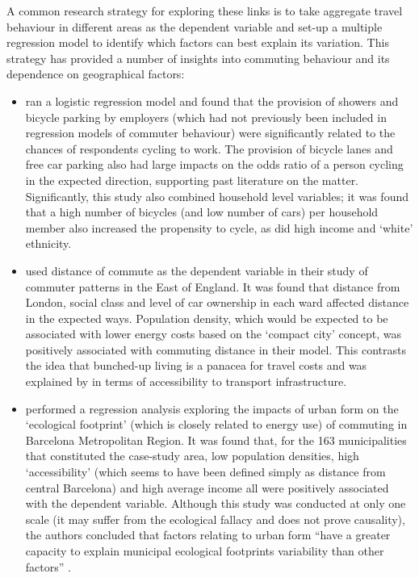 A common research strategy for exploring these links is to take aggregate travel
behaviour in different areas as the dependent variable and set-up a
multiple regression model to identify which factors can best explain its variation.
This strategy has provided a number of insights into commuting
behaviour and its dependence on geographical factors:
\begin{itemize}
 \item \citet{Buehler2012} ran a logistic regression model and found that
 the provision of showers and bicycle parking by employers (which
 had not previously been included in regression models of commuter behaviour)
 were significantly related to the chances of respondents cycling to work.
 The provision of bicycle lanes and free car parking also had large
 impacts on the odds ratio of a person cycling in the expected
 direction, supporting past literature on the matter. Significantly, this
 study also combined household level variables; it was found that a high number
 of bicycles (and low number of cars) per household member also increased the
 propensity to cycle, as did high income and `white' ethnicity.
 \item  \citet{Titheridge2006} used distance of commute as the dependent variable
 in their study of commuter patterns in the East of England. It was found that
 distance from London, social class and level of car ownership in each ward
 affected distance in the expected ways. Population density, which would
 be expected to be associated with lower energy costs based on the `compact
 city' concept, was positively associated with commuting distance in their model.
 This contrasts the idea that bunched-up living is a panacea for travel costs and
 was explained by \citet{Titheridge2006} in terms of accessibility to transport
 infrastructure.
 \item \citet{Muniz2005} performed a regression analysis exploring the impacts of urban form on
 the `ecological footprint' (which is closely related to energy use) of commuting
 in Barcelona Metropolitan Region. It was found that, for the 163 municipalities
 that constituted the case-study area, low population densities, high `accessibility'
 (which seems to have been defined simply as distance from central Barcelona)
 and high average income all were positively associated with the dependent variable.
 Although this study was conducted at only one scale (it may suffer from the
 ecological fallacy and does not prove causality), the authors concluded that
 factors relating to urban form ``have a greater capacity to explain municipal
 ecological footprints variability than other factors'' \citep[p.~511]{Muniz2005}.
\end{itemize}

